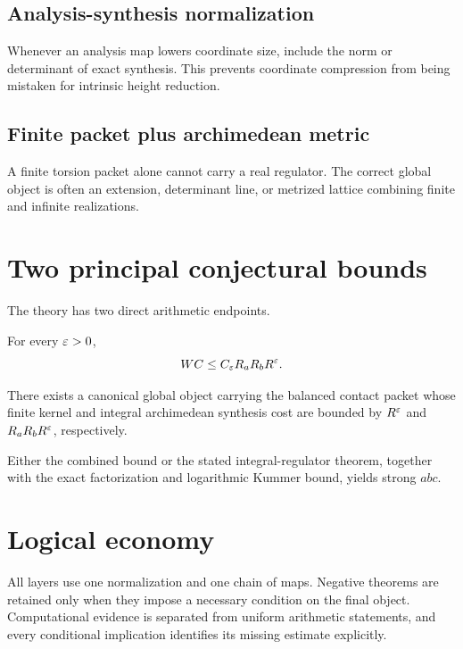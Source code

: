 \subsection{Analysis-synthesis normalization}
Whenever an analysis map lowers coordinate size, include the norm or determinant of exact synthesis. This prevents coordinate compression from being mistaken for intrinsic height reduction.

\subsection{Finite packet plus archimedean metric}
A finite torsion packet alone cannot carry a real regulator. The correct global object is often an extension, determinant line, or metrized lattice combining finite and infinite realizations.

\section{Two principal conjectural bounds}
The theory has two direct arithmetic endpoints.

\begin{conjecture}
For every $\varepsilon>0$,
\[
 WC\le C_\varepsilon R_aR_bR^\varepsilon.
\]
\end{conjecture}

\begin{conjecture}
There exists a canonical global object carrying the balanced contact packet whose finite kernel and integral archimedean synthesis cost are bounded by $R^\varepsilon$ and $R_aR_bR^\varepsilon$, respectively.
\end{conjecture}

Either the combined bound or the stated integral-regulator theorem, together with the exact factorization and logarithmic Kummer bound, yields strong $abc$.

\section{Logical economy}
All layers use one normalization and one chain of maps. Negative theorems are retained only when they impose a necessary condition on the final object. Computational evidence is separated from uniform arithmetic statements, and every conditional implication identifies its missing estimate explicitly.
